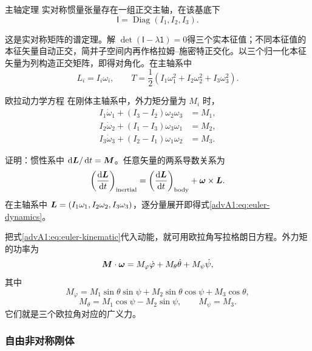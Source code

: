 \begin{advtheorem}{主轴定理}\label{advA1:thm:principal-axes}
实对称惯量张量存在一组正交主轴，在该基底下
\[
 \mathsf I=\operatorname{Diag}(I_1,I_2,I_3).
\]
\end{advtheorem}
这是实对称矩阵的谱定理。解
$\det(\mathsf I-\lambda\mathsf1)=0$得三个实本征值；不同本征值的本征矢量自动正交，简并子空间内再作格拉姆--施密特正交化。以三个归一化本征矢量为列构造正交矩阵，即得对角化。在主轴系中
\[
 L_i=I_i\omega_i,
 \qquad T=\frac12(I_1\omega_1^2+I_2\omega_2^2+I_3\omega_3^2).
\]

\begin{advtheorem}{欧拉动力学方程}\label{advA1:thm:euler-dynamics}
在刚体主轴系中，外力矩分量为 $M_i$ 时，
\begin{equation}\label{advA1:eq:euler-dynamics}
 \begin{aligned}
 I_1\dot\omega_1+(I_3-I_2)\omega_2\omega_3&=M_1,\\
 I_2\dot\omega_2+(I_1-I_3)\omega_3\omega_1&=M_2,\\
 I_3\dot\omega_3+(I_2-I_1)\omega_1\omega_2&=M_3.
 \end{aligned}
\end{equation}
\end{advtheorem}
证明：惯性系中 $\mathop{}\!\mathrm d\bm{L}/\mathop{}\!\mathrm d t=\bm{M}$。任意矢量的两系导数关系为
\[
 \left(\frac{\mathop{}\!\mathrm d\bm{L}}{\mathop{}\!\mathrm d t}\right)_{\rm inertial}
 =\left(\frac{\mathop{}\!\mathrm d\bm{L}}{\mathop{}\!\mathrm d t}\right)_{\rm body}
 +\bm{\omega}\times\bm{L}.
\]
在主轴系中 $\bm{L}=(I_1\omega_1,I_2\omega_2,I_3\omega_3)$，逐分量展开即得式\eqref{advA1:eq:euler-dynamics}。

把式\eqref{advA1:eq:euler-kinematic}代入动能，就可用欧拉角写拉格朗日方程。外力矩的功率为
\[
 \bm{M}\cdot\bm{\omega}=M_\varphi\dot\varphi
 +M_\theta\dot\theta+M_\psi\dot\psi,
\]
其中
\[
 M_\varphi=M_1\sin\theta\sin\psi+M_2\sin\theta\cos\psi+M_3\cos\theta,
\]
\[
 M_\theta=M_1\cos\psi-M_2\sin\psi,
 \qquad M_\psi=M_3.
\]
它们就是三个欧拉角对应的广义力。

\subsubsection{自由非对称刚体}

